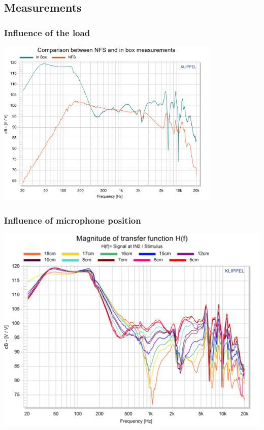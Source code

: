 \documentclass{report}
\begin{document}
\begin{appendices}
\subsection{Measurements}

\subsubsection{Influence of the load}
\label{Curves:InfluLoad}

\begin{center}
	\includegraphics[width=0.8\textwidth]{RoomComp/Compa_NFS_BAffle} 
    \captionsetup{hypcap=false} 
	\label{fig:Load_Compa}
\end{center}


\subsubsection{Influence of microphone position}
\label{Curves:InfluMicPos}


\begin{center}	
	\includegraphics[scale=0.76,angle=90]{RoomComp/MicPos_TRF} 
	\captionsetup{hypcap=false} 
	\label{fig:micpos_TRF_big}
\end{center}


\end{appendices}
\end{document}
